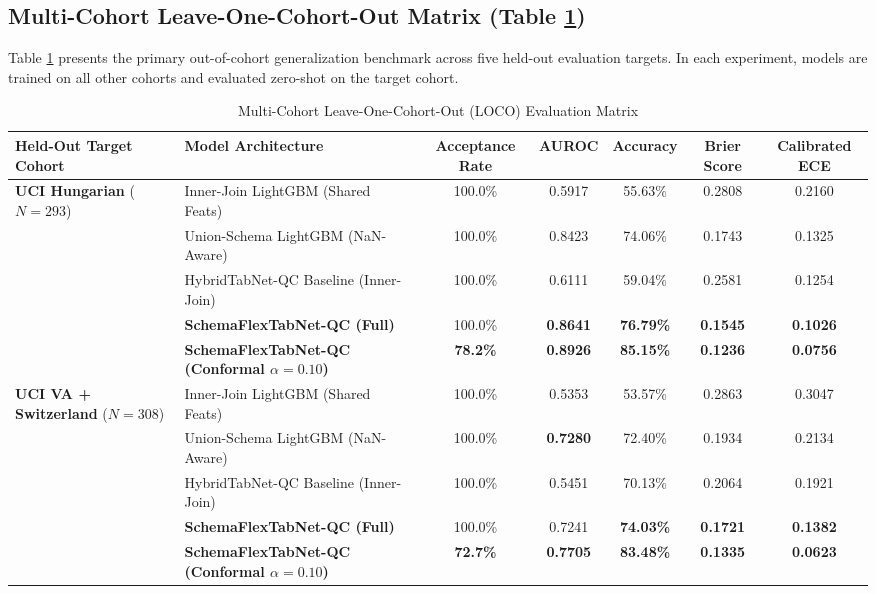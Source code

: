 \documentclass[journal]{IEEEtran}
\begin{document}
\subsection{Multi-Cohort Leave-One-Cohort-Out Matrix (Table \ref{tab:multi_cohort_matrix})}
Table \ref{tab:multi_cohort_matrix} presents the primary out-of-cohort generalization benchmark across five held-out evaluation targets. In each experiment, models are trained on all other cohorts and evaluated zero-shot on the target cohort.

\begin{table}[t]
\caption{Multi-Cohort Leave-One-Cohort-Out (LOCO) Evaluation Matrix}
\label{tab:multi_cohort_matrix}
\centering
\begin{tabular}{llccccc}
\toprule
\textbf{Held-Out Target Cohort} & \textbf{Model Architecture} & \textbf{Acceptance Rate} & \textbf{AUROC} & \textbf{Accuracy} & \textbf{Brier Score} & \textbf{Calibrated ECE} \\
\midrule
\multirow{5}{*}{\textbf{UCI Hungarian} ($N=293$)}
 & Inner-Join LightGBM (Shared Feats) & 100.0\% & 0.5917 & 55.63\% & 0.2808 & 0.2160 \\
 & Union-Schema LightGBM (NaN-Aware)  & 100.0\% & 0.8423 & 74.06\% & 0.1743 & 0.1325 \\
 & HybridTabNet-QC Baseline (Inner-Join) & 100.0\% & 0.6111 & 59.04\% & 0.2581 & 0.1254 \\
 & \textbf{SchemaFlexTabNet-QC (Full)} & 100.0\% & \textbf{0.8641} & \textbf{76.79\%} & \textbf{0.1545} & \textbf{0.1026} \\
 & \textbf{SchemaFlexTabNet-QC (Conformal $\alpha=0.10$)} & \textbf{78.2\%} & \textbf{0.8926} & \textbf{85.15\%} & \textbf{0.1236} & \textbf{0.0756} \\
\midrule
\multirow{5}{*}{\textbf{UCI VA + Switzerland} ($N=308$)}
 & Inner-Join LightGBM (Shared Feats) & 100.0\% & 0.5353 & 53.57\% & 0.2863 & 0.3047 \\
 & Union-Schema LightGBM (NaN-Aware)  & 100.0\% & \textbf{0.7280} & 72.40\% & 0.1934 & 0.2134 \\
 & HybridTabNet-QC Baseline (Inner-Join) & 100.0\% & 0.5451 & 70.13\% & 0.2064 & 0.1921 \\
 & \textbf{SchemaFlexTabNet-QC (Full)} & 100.0\% & 0.7241 & \textbf{74.03\%} & \textbf{0.1721} & \textbf{0.1382} \\
 & \textbf{SchemaFlexTabNet-QC (Conformal $\alpha=0.10$)} & \textbf{72.7\%} & \textbf{0.7705} & \textbf{83.48\%} & \textbf{0.1335} & \textbf{0.0623} \\

\end{tabular}
\end{table}
\end{document}
